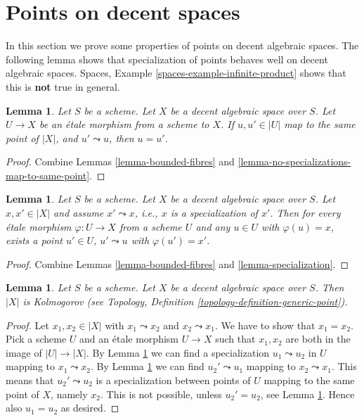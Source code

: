 \documentclass{stacks-project}
\theoremstyle{plain}
\newtheorem{lemma}[subsection]{Lemma}
\theoremstyle{definition}
\theoremstyle{remark}
\numberwithin{equation}{subsection}
\begin{document}
\section{Points on decent spaces}
\label{section-points}

\noindent
In this section we prove some properties of points on decent algebraic spaces.
The following lemma shows that specialization of points behaves well
on decent algebraic spaces.
Spaces, Example \ref{spaces-example-infinite-product}
shows that this is {\bf not} true in general.

\begin{lemma}
\label{lemma-decent-no-specializations-map-to-same-point}
Let $S$ be a scheme. Let $X$ be a decent algebraic space over $S$.
Let $U \to X$ be an \'etale morphism from a scheme to $X$.
If $u, u' \in |U|$ map to the same point of $|X|$, and
$u' \leadsto u$, then $u = u'$.
\end{lemma}

\begin{proof}
Combine Lemmas \ref{lemma-bounded-fibres} and
\ref{lemma-no-specializations-map-to-same-point}.
\end{proof}

\begin{lemma}
\label{lemma-decent-specialization}
Let $S$ be a scheme. Let $X$ be a decent algebraic space over $S$.
Let $x, x' \in |X|$ and assume $x' \leadsto x$, i.e., $x$ is a
specialization of $x'$. Then for every \'etale morphism
$\varphi : U \to X$ from a scheme $U$ and any $u \in U$ with
$\varphi(u) = x$, exists a point $u'\in U$, $u' \leadsto u$ with
$\varphi(u') = x'$.
\end{lemma}

\begin{proof}
Combine Lemmas \ref{lemma-bounded-fibres} and
\ref{lemma-specialization}.
\end{proof}

\begin{lemma}
\label{lemma-kolmogorov}
Let $S$ be a scheme. Let $X$ be a decent algebraic space over $S$.
Then $|X|$ is Kolmogorov (see
Topology, Definition \ref{topology-definition-generic-point}).
\end{lemma}

\begin{proof}
Let $x_1, x_2 \in |X|$ with $x_1 \leadsto x_2$ and $x_2 \leadsto x_1$.
We have to show that $x_1 = x_2$. Pick a scheme $U$ and an \'etale morphism
$U \to X$ such that $x_1, x_2$ are both in the image of $|U| \to |X|$.
By Lemma \ref{lemma-decent-specialization} we can find a specialization
$u_1 \leadsto u_2$ in $U$ mapping to $x_1 \leadsto x_2$.
By Lemma \ref{lemma-decent-specialization} we can find
$u_2' \leadsto u_1$ mapping to $x_2 \leadsto x_1$. This means that
$u_2' \leadsto u_2$ is a specialization between points of $U$ mapping to
the same point of $X$, namely $x_2$. This is not possible, unless
$u_2' = u_2$, see
Lemma \ref{lemma-decent-no-specializations-map-to-same-point}. Hence
also $u_1 = u_2$ as desired.
\end{proof}
\end{document}
